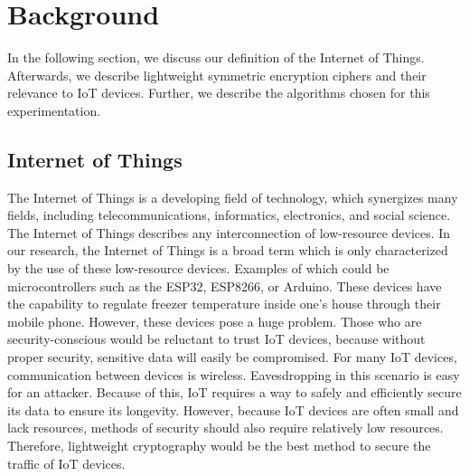 \documentclass[conference]{IEEEtran}
\begin{document}
\section{Background}
In the following section, we discuss our definition of the Internet of Things. Afterwards, we describe lightweight symmetric encryption ciphers and their relevance to IoT devices. Further, we describe the algorithms chosen for this experimentation.	

\subsection{Internet of Things}
The Internet of Things is a developing field of technology, which synergizes many fields, including telecommunications, informatics, electronics, and social science. The Internet of Things describes any interconnection of low-resource devices. In our research, the Internet of Things is a broad term which is only characterized by the use of these low-resource devices. Examples of which could be microcontrollers such as the ESP32, ESP8266, or Arduino. These devices have the capability to regulate freezer temperature inside one’s house through their mobile phone. However, these devices pose a huge problem.
Those who are security-conscious would be reluctant to trust IoT devices, because without proper security, sensitive data will easily be compromised. For many IoT devices, communication between devices is wireless. Eavesdropping in this scenario is easy for an attacker.\cite{3} Because of this, IoT requires a way to safely and efficiently secure its data to ensure its longevity. However, because IoT devices are often small and lack resources, methods of security should also require relatively low resources. Therefore, lightweight cryptography would be the best method to secure the traffic of IoT devices.
\end{document}
